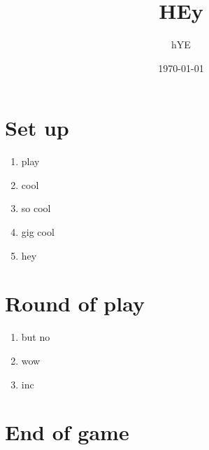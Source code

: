 \documentclass{article}%
\title{HEy}%
\author{hYE}%
\date{\today}%
\begin{document}
%
\pagestyle{empty}%
\normalsize%
\maketitle%
\section{ Set up
}%
\label{sec:Setup}%
\begin{enumerate}%
\item%
 play
%
\item%
 cool
%
\item%
 so cool
%
\item%
 gig cool
%
\item%
 hey
%
\end{enumerate}

%
\section{ Round of play
}%
\label{sec:Roundofplay}%
\begin{enumerate}%
\item%
 but no
%
\item%
 wow
%
\item%
 inc
%
\end{enumerate}

%
\section{ End of game}%
\label{sec:Endofgame}%

%
\end{document}
